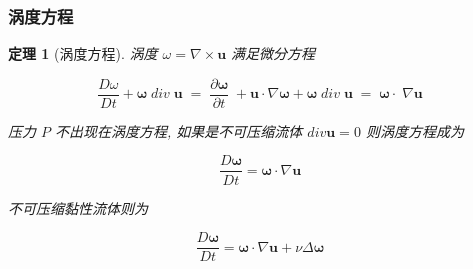 \documentclass[aspectratio=2516]{beamer}
\newtheorem{thm}{\kaishu 定理}
\begin{document}
\begin{frame}
\frametitle{ \kaishu 涡度方程}

\kaishu 

\vspace{-0.35cm}

\begin{thm}[\kaishu 涡度方程]
	
	\kaishu
	
	涡度 $\omega  = \nabla  \times \boldsymbol{u}$ 满足微分方程
	
	\begin{equation}
	\frac{{D\omega }}{{Dt}} + \boldsymbol{\omega} \;div\;\boldsymbol{u}\; = \;\frac{{\partial \boldsymbol{\omega} }}{{\partial t}}\; + \boldsymbol{u} \cdot \nabla \boldsymbol{\omega}  + \boldsymbol{\omega} \;div\;\boldsymbol{u}\; = \;\boldsymbol{\omega}  \cdot \;\nabla \boldsymbol{u}
	\label{eq5.3.7}
	\end{equation}
	
	压力 $ P $ 不出现在涡度方程, 如果是不可压缩流体 $ div \boldsymbol{u} = 0 $ 则涡度方程成为 
	
	\begin{equation}
	\frac{{D \boldsymbol{\omega} }}{{Dt}} = \boldsymbol{\omega}  \cdot \nabla \boldsymbol{u}
	\label{eq5.3.8}
	\end{equation}
	
	不可压缩黏性流体则为
	
	\begin{equation}
	\frac{{D\boldsymbol{\omega} }}{{Dt}} = \boldsymbol{\omega}  \cdot \nabla \boldsymbol{u} + \nu \Delta \boldsymbol{\omega}
	\label{eq5.3.9}
	\end{equation}
	
\end{thm}
\end{frame}

\end{document}
